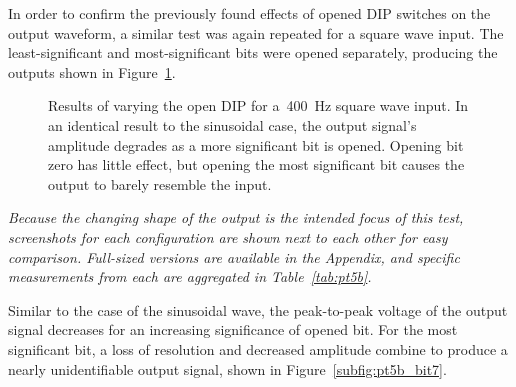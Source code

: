 In order to confirm the previously found effects of opened DIP switches on the output waveform, a similar test was again repeated for a square wave input.  The least-significant and most-significant bits were opened separately, producing the outputs shown in Figure~\ref{fig:pt5b}.
%
\begin{figure}[H]
	\centering
	\quad

	\parbox{.8\textwidth}{
	\caption[\SI{400}{\hertz} Square Wave --- DIP Switches]{Results of varying the open DIP for a~\SI{400}{\hertz} square wave input.  In an identical result to the sinusoidal case, the output signal's amplitude degrades as a more significant bit is opened.  Opening bit zero has little effect, but opening the most significant bit causes the output to barely resemble the input.}
	\label{fig:pt5b}}
\end{figure}
%
\emph{Because the changing shape of the output is the intended focus of this test, screenshots for each configuration are shown next to each other for easy comparison.  Full-sized versions are available in the Appendix, and specific measurements from each are aggregated in Table~\ref{tab:pt5b}.}
%
\begin{table}[H]
	\centering
	
	\parbox{.6\textwidth}{
	\caption[\SI{400}{\hertz} Square Wave --- DIP Switches]{Measured output of a varying state of DIP switch positions for a~\SI{400}{\hertz} square wave input.}
	\label{tab:pt5b}}
\end{table}
%
Similar to the case of the sinusoidal wave, the peak-to-peak voltage of the output signal decreases for an increasing significance of opened bit.  For the most significant bit, a loss of resolution and decreased amplitude combine to produce a nearly unidentifiable output signal, shown in Figure~\ref{subfig:pt5b_bit7}.

